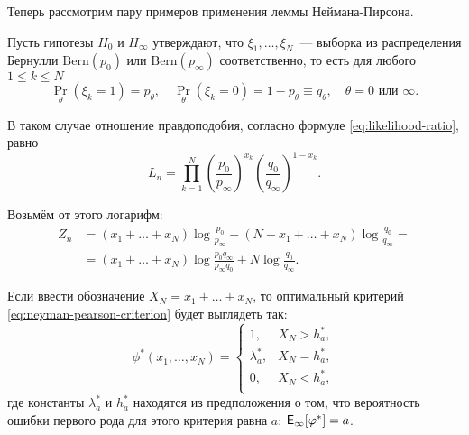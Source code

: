 Теперь рассмотрим пару примеров применения леммы Неймана-Пирсона.
\begin{example}
	Пусть гипотезы \(H_{0}\) и \(H_{\infty}\) утверждают,  что \(\xi_{1}, 
	\ldots, \xi_{N}\)~--- выборка из распределения Бернулли 
	\(\mathrm{Bern}(p_{0})\) или \(\mathrm{Bern}(p_{\infty})\) соответственно, 
	то есть для любого \(1 \leq k \leq N\)
	\[
		\Pr_{\theta}(\xi_{k} = 1) = p_{\theta},
		\quad
		\Pr_{\theta}(\xi_{k} = 0) = 1 - p_{\theta} \equiv q_{\theta},
		\quad \theta = 0 \text{ или } \infty.
	\]
	
	В таком случае отношение правдоподобия, согласно формуле 
	\eqref{eq:likelihood-ratio}, равно
	\[
		L_{n} = \prod_{k = 1}^{N} \left(\frac{p_{0}}{p_{\infty}}\right)^{x_{k}} 
		\left(\frac{q_{0}}{q_{\infty}}\right)^{1 - x_{k}}.
	\]
	
	Возьмём от этого логарифм:
	\begin{align*}
		Z_{n} &= (x_{1} + \ldots + x_{N})\log\frac{p_{0}}{p_{\infty}} + (N - 
		x_{1} + \ldots + x_{N})\log\frac{q_{0}}{q_{\infty}} = \\
		&= (x_{1} + \ldots + x_{N})\log\frac{p_{0}q_{\infty}}{p_{\infty}q_{0}} 
		+ N\log\frac{q_{0}}{q_{\infty}}.
	\end{align*}
	
	Если ввести обозначение \(X_{N} = x_{1} + \ldots + x_{N}\), то оптимальный 
	критерий \eqref{eq:neyman-pearson-criterion} будет выглядеть так:
	\begin{equation}
		\phi^{*}(x_{1}, \ldots, x_{N}) = 
		\begin{cases}
			1, & X_{N} > h_{a}^{*}, \\
			\lambda_{a}^{*}, & X_{N} = h_{a}^{*}, \\
			0, & X_{N} < h_{a}^{*}, \\
		\end{cases}
	\end{equation}
	где константы \(\lambda_{a}^{*}\) и \(h_{a}^{*}\) находятся из 
	предположения о том, что вероятность ошибки первого рода для этого критерия 
	равна \(a\): \(\E_{\infty}[\phi^{*}] = a\).
\end{example}

